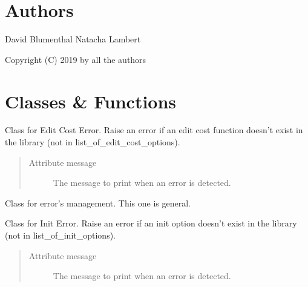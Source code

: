 \documentclass[letterpaper,10pt,english]{sphinxmanual}
\begin{document}
\section{Authors}
\label{doc:authors}
David Blumenthal
Natacha Lambert

Copyright (C) 2019 by all the authors


\section{Classes \& Functions}
\label{doc:classes-functions}

\begin{fulllineitems}
\label{doc:gedlibpy.EditCostError}
Class for Edit Cost Error. Raise an error if an edit cost function doesn't exist in the library (not in list\_of\_edit\_cost\_options).
\begin{quote}\begin{description}
\item[{Attribute message}] \leavevmode
The message to print when an error is detected.

\end{description}\end{quote}

\end{fulllineitems}


\begin{fulllineitems}
\label{doc:gedlibpy.Error}
Class for error's management. This one is general.

\end{fulllineitems}


\begin{fulllineitems}
\label{doc:gedlibpy.InitError}
Class for Init Error. Raise an error if an init option doesn't exist in the library (not in list\_of\_init\_options).
\begin{quote}\begin{description}
\item[{Attribute message}] \leavevmode
The message to print when an error is detected.

\end{description}\end{quote}

\end{fulllineitems}
\end{document}
